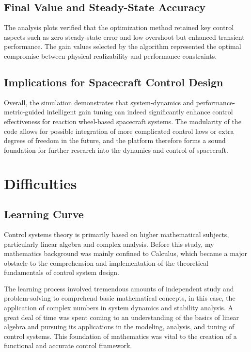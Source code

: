 \documentclass{ifacconf}
\begin{document}
\subsection{Final Value and Steady-State Accuracy}

The analysis plots verified that the optimization method retained key control aspects such as zero steady-state error and low overshoot but enhanced transient performance. The gain values selected by the algorithm represented the optimal compromise between physical realizability and performance constraints.

\subsection{Implications for Spacecraft Control Design}

Overall, the simulation demonstrates that system-dynamics and performance-metric-guided intelligent gain tuning can indeed significantly enhance control effectiveness for reaction wheel-based spacecraft systems. The modularity of the code allows for possible integration of more complicated control laws or extra degrees of freedom in the future, and the platform therefore forms a sound foundation for further research into the dynamics and control of spacecraft.




\section{Difficulties}

\subsection{Learning Curve}
Control systems theory is primarily based on higher mathematical subjects, particularly linear algebra and complex analysis. Before this study, my mathematics background was mainly confined to Calculus, which became a major obstacle to the comprehension and implementation of the theoretical fundamentals of control system design.

The learning process involved tremendous amounts of independent study and problem-solving to comprehend basic mathematical concepts, in this case, the application of complex numbers in system dynamics and stability analysis. A great deal of time was spent coming to an understanding of the basics of linear algebra and pursuing its applications in the modeling, analysis, and tuning of control systems. This foundation of mathematics was vital to the creation of a functional and accurate control framework. 
\end{document}
